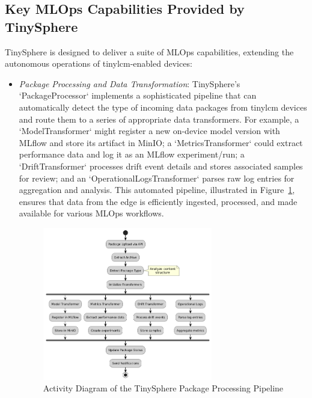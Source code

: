 \subsection{Key MLOps Capabilities Provided by TinySphere}
\label{ssec:tinysphere_capabilities}

TinySphere is designed to deliver a suite of MLOps capabilities, extending the autonomous operations of \gls{tinylcm}-enabled devices:

\begin{itemize}
    \item \textit{Package Processing and Data Transformation}: TinySphere's `PackageProcessor` implements a sophisticated pipeline that can automatically detect the type of incoming data packages from \gls{tinylcm} devices and route them to a series of appropriate data transformers. For example, a `ModelTransformer` might register a new on-device model version with MLflow and store its artifact in MinIO; a `MetricsTransformer` could extract performance data and log it as an MLflow experiment/run; a `DriftTransformer` processes drift event details and stores associated samples for review; and an `OperationalLogsTransformer` parses raw log entries for aggregation and analysis. This automated pipeline, illustrated in Figure~\ref{fig:package_processing_pipeline}, ensures that data from the edge is efficiently ingested, processed, and made available for various MLOps workflows.

    \begin{figure}[htbp]
        \centering
        \includegraphics[width=0.7\textwidth]{figs/framework/package-processing-pipeline.png}
        \caption[Package Processing Pipeline in TinySphere]{Activity Diagram of the TinySphere Package Processing Pipeline}
        \label{fig:package_processing_pipeline}
    \end{figure}


\end{itemize}
